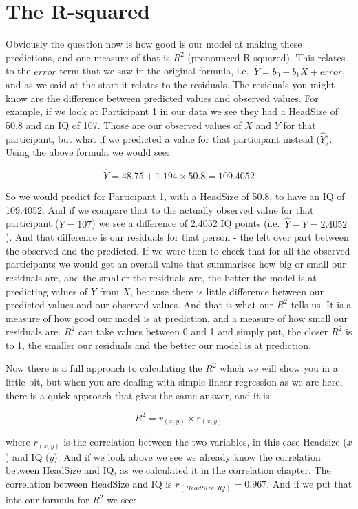 \documentclass[
  oneside]{book}
\begin{document}
\hypertarget{the-r-squared}{%
\section{The R-squared}\label{the-r-squared}}

Obviously the question now is how good is our model at making these predictions, and one measure of that is \(R^2\) (pronounced R-squared). This relates to the \(error\) term that we saw in the original formula, i.e.~\(\hat{Y} = b_{0} + b_{1}X + error\), and as we said at the start it relates to the residuals. The residuals you might know are the difference between predicted values and observed values. For example, if we look at Participant 1 in our data we see they had a HeadSize of 50.8 and an IQ of 107. Those are our observed values of \(X\) and \(Y\) for that participant, but what if we predicted a value for that participant instead (\(\hat{Y}\)). Using the above formula we would see:

\[\hat{Y} = 48.75 + 1.194 \times 50.8 = 109.4052\]

So we would predict for Participant 1, with a HeadSize of 50.8, to have an IQ of 109.4052. And if we compare that to the actually observed value for that participant (\(Y = 107\)) we see a difference of 2.4052 IQ points (i.e.~\(\hat{Y} - Y = 2.4052\)). And that difference is our residuals for that person - the left over part between the observed and the predicted. If we were then to check that for all the observed participants we would get an overall value that summarises how big or small our residuals are, and the smaller the residuals are, the better the model is at predicting values of \(Y\) from \(X\), because there is little difference between our predicted values and our observed values. And that is what our \(R^2\) tells us. It is a measure of how good our model is at prediction, and a measure of how small our residuals are. \(R^2\) can take values between 0 and 1 and simply put, the closer \(R^2\) is to 1, the smaller our residuals and the better our model is at prediction.

Now there is a full approach to calculating the \(R^2\) which we will show you in a little bit, but when you are dealing with simple linear regression as we are here, there is a quick approach that gives the same answer, and it is:

\[R^2 = r_{(x,y)} \times r_{(x,y)}\]

where \(r_{(x,y)}\) is the correlation between the two variables, in this case Headsize (\(x\)) and IQ (\(y\)). And if we look above we see we already know the correlation between HeadSize and IQ, as we calculated it in the correlation chapter. The correlation between HeadSize and IQ is \(r_{(HeadSize, IQ)} = 0.967\). And if we put that into our formula for \(R^2\) we see:
\end{document}
